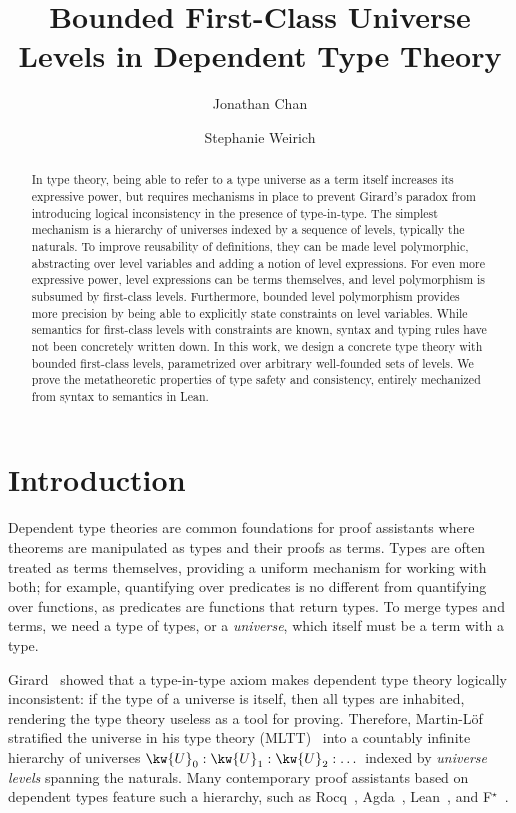 \documentclass[a4paper,UKenglish,cleveref,autoref,thm-restate]{lipics-v2021}
\title{Bounded First-Class Universe Levels \titlebreak in Dependent Type Theory}
\author{Jonathan Chan}
  {University of Pennsylvania, Philadelphia, USA}
  {jcxz@seas.upenn.edu}
  {0000-0003-0830-3180}
  {}
\author{Stephanie Weirich}
  {University of Pennsylvania, Philadelphia, USA}
  {sweirich@seas.upenn.edu}
  {0000-0002-6756-9168}
  {}
\newcommand{\citep}[1]{\cite{#1}}
\begin{document}
\setlength{\abovedisplayskip}{0.25\baselineskip}
\setlength{\belowdisplayskip}{0.25\baselineskip}

\maketitle

\begin{abstract}
  In type theory, being able to refer to a type universe as a term itself
  increases its expressive power,
  but requires mechanisms in place to prevent Girard's paradox
  from introducing logical inconsistency in the presence of type-in-type.
  The simplest mechanism is a hierarchy of universes indexed by a sequence of levels,
  typically the naturals.
  To improve reusability of definitions,
  they can be made level polymorphic,
  abstracting over level variables and adding a notion of level expressions.
  For even more expressive power,
  level expressions can be terms themselves,
  and level polymorphism is subsumed by first-class levels.
  Furthermore, bounded level polymorphism provides more precision
  by being able to explicitly state constraints on level variables.
  While semantics for first-class levels with constraints are known,
  syntax and typing rules have not been concretely written down.
  In this work, we design a concrete type theory with bounded first-class levels,
  parametrized over arbitrary well-founded sets of levels.
  We prove the metatheoretic properties of type safety and consistency,
  entirely mechanized from syntax to semantics in Lean.
\end{abstract}

\section{Introduction}

Dependent type theories are common foundations for proof assistants
where theorems are manipulated as types and their proofs as terms.
Types are often treated as terms themselves,
providing a uniform mechanism for working with both;
for example, quantifying over predicates is no different from quantifying over functions,
as predicates are functions that return types.
To merge types and terms, we need a type of types, or a \emph{universe},
which itself must be a term with a type.

Girard~\citep{systemf} showed that a type-in-type axiom makes dependent type theory logically inconsistent:
if the type of a universe is itself, then all types are inhabited,
rendering the type theory useless as a tool for proving.
Therefore, Martin-L\"of stratified the universe in his type theory (MLTT)~\citep{mltt}
into a countably infinite hierarchy of universes
$ \kw{U}_{  0  }  :  \kw{U}_{  1  }  :  \kw{U}_{  2  }  : \dots$
indexed by \emph{universe levels} spanning the naturals.
Many contemporary proof assistants based on dependent types feature such a hierarchy,
such as Rocq~\citep{rocq}, Agda~\citep{agda}, Lean~\citep{lean}, and F$^\star$~\citep{fstar}.
\end{document}
